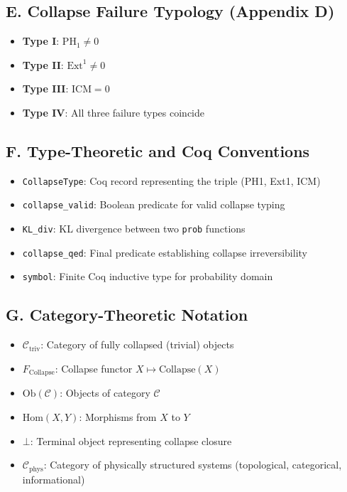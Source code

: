 \documentclass[11pt]{article}
\begin{document}
\subsection*{E. Collapse Failure Typology (Appendix D)}

\begin{itemize}
  \item \textbf{Type I}: \( \mathrm{PH}_1 \ne 0 \)
  \item \textbf{Type II}: \( \mathrm{Ext}^1 \ne 0 \)
  \item \textbf{Type III}: \( \mathrm{ICM} = 0 \)
  \item \textbf{Type IV}: All three failure types coincide
\end{itemize}

\subsection*{F. Type-Theoretic and Coq Conventions}

\begin{itemize}
  \item \texttt{CollapseType}: Coq record representing the triple (PH1, Ext1, ICM)
  \item \texttt{collapse\_valid}: Boolean predicate for valid collapse typing
  \item \texttt{KL\_div}: KL divergence between two \texttt{prob} functions
  \item \texttt{collapse\_qed}: Final predicate establishing collapse irreversibility
  \item \texttt{symbol}: Finite Coq inductive type for probability domain
\end{itemize}


\subsection*{G. Category-Theoretic Notation}

\begin{itemize}
  \item \( \mathcal{C}_{\mathrm{triv}} \): Category of fully collapsed (trivial) objects
  \item \( F_{\mathrm{Collapse}} \): Collapse functor \( X \mapsto \mathrm{Collapse}(X) \)
  \item \( \mathrm{Ob}(\mathcal{C}) \): Objects of category \( \mathcal{C} \)
  \item \( \mathrm{Hom}(X, Y) \): Morphisms from \( X \) to \( Y \)
  \item \( \bot \): Terminal object representing collapse closure
  \item \( \mathcal{C}_{\mathrm{phys}} \): Category of physically structured systems (topological, categorical, informational)

\end{itemize}
\end{document}
